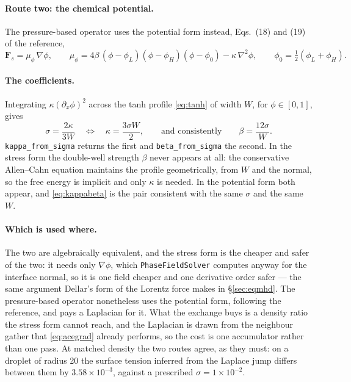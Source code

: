 \documentclass[11pt,a4paper]{article}
\newcommand{\code}[1]{\texttt{\small #1}}
\newcommand{\e}[1]{\times 10^{#1}}
\begin{document}
\paragraph{Route two: the chemical potential.} The pressure-based operator uses
the potential form instead, Eqs.~(18) and (19) of the reference,
\begin{equation}
  \bm{F}_s = \mu_\phi\,\nabla\phi,
  \qquad
  \mu_\phi = 4\beta\,(\phi-\phi_L)(\phi-\phi_H)(\phi-\phi_0)
    - \kappa\,\nabla^2\phi,
  \qquad \phi_0 = \tfrac12(\phi_L+\phi_H).
  \label{eq:chempot}
\end{equation}

\paragraph{The coefficients.} Integrating $\kappa(\partial_x\phi)^2$ across the
tanh profile \eqref{eq:tanh} of width $W$, for $\phi\in[0,1]$, gives
\begin{equation}
  \sigma = \frac{2\kappa}{3W}
  \quad\Longleftrightarrow\quad
  \kappa = \frac{3\sigma W}{2},
  \qquad\text{and consistently}\qquad
  \beta = \frac{12\sigma}{W}.
  \label{eq:kappabeta}
\end{equation}
\code{kappa\_from\_sigma} returns the first and \code{beta\_from\_sigma} the
second. In the stress form the double-well strength $\beta$ never appears at all:
the conservative Allen--Cahn equation maintains the profile geometrically, from
$W$ and the normal, so the free energy is implicit and only $\kappa$ is needed.
In the potential form both appear, and \eqref{eq:kappabeta} is the pair
consistent with the same $\sigma$ and the same $W$.

\paragraph{Which is used where.} The two are algebraically equivalent, and the
stress form is the cheaper and safer of the two: it needs only $\nabla\phi$,
which \code{PhaseFieldSolver} computes anyway for the interface normal, so it is
one field cheaper and one derivative order safer --- the same argument Dellar's
form of the Lorentz force makes in \S\ref{sec:eqmhd}. The pressure-based operator
nonetheless uses the potential form, following the reference, and pays a
Laplacian for it. What the exchange buys is a density ratio the stress form
cannot reach, and the Laplacian is drawn from the neighbour gather that
\eqref{eq:acegrad} already performs, so the cost is one accumulator rather than
one pass. At matched density the two routes agree, as they must: on a droplet of
radius 20 the surface tension inferred from the Laplace jump differs between them
by $3.58\e{-3}$, against a prescribed $\sigma = 1\e{-2}$.
\end{document}
